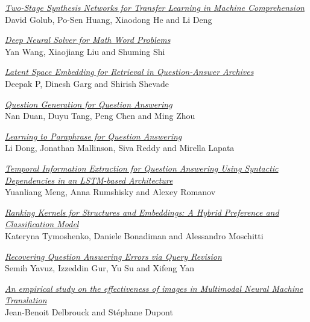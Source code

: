 \hyperlink{page.844}{\em Two-Stage Synthesis Networks for Transfer Learning in Machine Comprehension}\samepage \\
\hspace*{7mm} David Golub, Po-Sen Huang, Xiaodong He and Li Deng\dotfill {}

\hyperlink{page.854}{\em Deep Neural Solver for Math Word Problems}\samepage \\
\hspace*{7mm} Yan Wang, Xiaojiang Liu and Shuming Shi\dotfill {}

\hyperlink{page.864}{\em Latent Space Embedding for Retrieval in Question-Answer Archives}\samepage \\
\hspace*{7mm} Deepak P, Dinesh Garg and Shirish Shevade\dotfill {}

\hyperlink{page.875}{\em Question Generation for Question Answering}\samepage \\
\hspace*{7mm} Nan Duan, Duyu Tang, Peng Chen and Ming Zhou\dotfill {}

\hyperlink{page.884}{\em Learning to Paraphrase for Question Answering}\samepage \\
\hspace*{7mm} Li Dong, Jonathan Mallinson, Siva Reddy and Mirella Lapata\dotfill {}

\hyperlink{page.896}{\em Temporal Information Extraction for Question Answering Using Syntactic Dependencies in an LSTM-based Architecture}\samepage \\
\hspace*{7mm} Yuanliang Meng, Anna Rumshisky and Alexey Romanov\dotfill {}

\hyperlink{page.906}{\em Ranking Kernels for Structures and Embeddings: A Hybrid Preference and Classification Model}\samepage \\
\hspace*{7mm} Kateryna Tymoshenko, Daniele Bonadiman and Alessandro Moschitti\dotfill {}

\hyperlink{page.912}{\em Recovering Question Answering Errors via Query Revision}\samepage \\
\hspace*{7mm} Semih Yavuz, Izzeddin Gur, Yu Su and Xifeng Yan\dotfill {}

\hyperlink{page.919}{\em An empirical study on the effectiveness of images in Multimodal Neural Machine Translation}\samepage \\
\hspace*{7mm} Jean-Benoit Delbrouck and St\'{e}phane Dupont\dotfill {}

